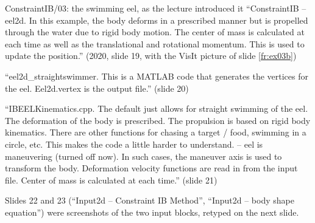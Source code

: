 \documentclass[aspectratio=169,11pt]{beamer}
\begin{document}
\begin{frame}{ConstraintIB/03: the swimming eel, as the lecture introduced it}
\label{fr:ex03}
\footnotesize ``ConstraintIB -- eel2d. In this example, the body deforms in a prescribed manner but is propelled through the water due to rigid body motion. The center of mass is calculated at each time as well as the translational and rotational momentum. This is used to update the position.'' (2020, slide 19, with the VisIt picture of slide \ref{fr:ex03b})
\vspace{1mm}

\footnotesize ``eel2d\_straightswimmer. This is a MATLAB code that generates the vertices for the eel. Eel2d.vertex is the output file.'' (slide 20)
\vspace{1mm}

\footnotesize ``IBEELKinematics.cpp. The default just allows for straight swimming of the eel. The deformation of the body is prescribed. The propulsion is based on rigid body kinematics. There are other functions for chasing a target / food, swimming in a circle, etc. This makes the code a little harder to understand.  -- eel is maneuvering (turned off now). In such cases, the maneuver axis is used to transform the body. Deformation velocity functions are read in from the input file. Center of mass is calculated at each time.'' (slide 21)
\vspace{1mm}

\footnotesize Slides 22 and 23 (``Input2d -- Constraint IB Method'', ``Input2d -- body shape equation'') were screenshots of the two input blocks, retyped on the next slide.
\end{frame}
\end{document}
